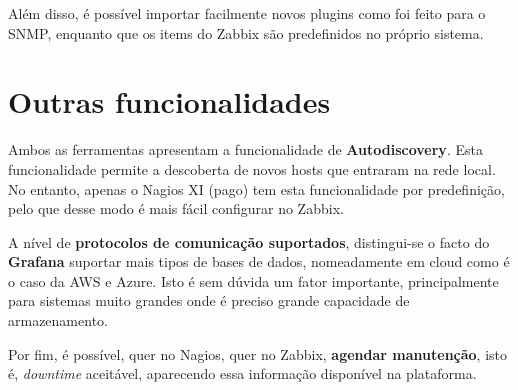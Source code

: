 Além disso, é possível importar facilmente novos plugins como foi feito para o SNMP, enquanto que os items do Zabbix são predefinidos no próprio sistema.

\section*{Outras funcionalidades}

Ambos as ferramentas apresentam a funcionalidade de \textbf{Autodiscovery}.
Esta funcionalidade permite a descoberta de novos hosts que entraram na rede local.
No entanto, apenas o Nagios XI (pago) tem esta funcionalidade por predefinição, pelo que desse modo é mais fácil configurar no Zabbix.

A nível de \textbf{protocolos de comunicação suportados}, distingui-se o facto do \textbf{Grafana} suportar mais tipos de bases de dados, nomeadamente em cloud como é o caso da AWS e Azure.
Isto é sem dúvida um fator importante, principalmente para sistemas muito grandes onde é preciso grande capacidade de armazenamento.

Por fim, é possível, quer no Nagios, quer no Zabbix, \textbf{agendar manutenção}, isto é, \textit{downtime} aceitável, aparecendo essa informação disponível na plataforma.
